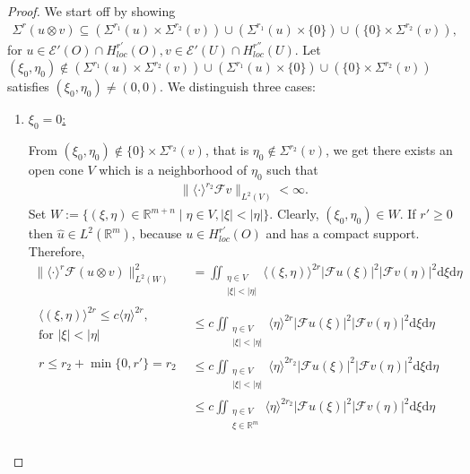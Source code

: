 \documentclass[10pt,a4paper]{amsart}
\begin{document}
\begin{proof}
We start off by showing
\begin{align}
\label{sigma}
\Sigma^r (u\otimes v)
\subseteq
(\Sigma^{r_1} (u) \times \Sigma^{r_2} (v)) \cup (\Sigma^{r_1} (u) \times \{0\}) \cup (\{0\} \times \Sigma^{r_2} (v)),
\end{align}
for $u\in \mathcal{E}' (O) \cap H_{loc} ^{r'} (O) , v\in \mathcal{E}' (U) \cap H_{loc} ^{r''} (U)$. Let $(\xi_0,\eta_0)\notin (\Sigma^{r_1} (u) \times \Sigma^{r_2} (v)) \cup (\Sigma^{r_1} (u) \times \{0\}) \cup (\{0\} \times \Sigma^{r_2} (v))$ satisfies $(\xi_0,\eta_0)\neq (0,0)$. We distinguish three cases:
\begin{enumerate}
\item \underline{$\xi_0 = 0$:}

From $(\xi_0,\eta_0)\notin \{0\} \times \Sigma^{r_2} (v)$, that is $\eta_0 \notin \Sigma^{r_2} (v)$, we get there exists an open cone $V$ which is a neighborhood of $\eta_0$ such that
\begin{align}
\label{eta0}
\lVert \langle\cdot \rangle^{r_2} \mathcal{F} v \rVert_{L^2 (V)}
< \infty.
\end{align}
Set $W:=\{(\xi , \eta) \in \mathbb{R}^{m+n} \mid \eta\in V , |\xi| < |\eta| \}$. Clearly, $(\xi_0,\eta_0)\in W$. If $r'\geq 0$ then $\hat{u}\in L^2 (\mathbb{R}^m)$, because $u\in H_{loc}  ^{r'} (O)$ and has a compact support. Therefore,
\begin{align*}
\lVert \langle \cdot \rangle^{r} \mathcal{F} (u\otimes v)  \rVert_{L^2 (W)} ^2
&= \iint_{\substack{ \eta\in V \\ |\xi|<|\eta| }} \langle (\xi ,\eta) \rangle^{2r} |\mathcal{F}u (\xi)|^2 |\mathcal{F}v (\eta)|^2 \mathrm{d}\xi \mathrm{d}\eta \\
\boxed{\substack{\langle (\xi ,\eta) \rangle^{2r} \leq c \langle \eta \rangle^{2r}, \\ \text{for } |\xi| < |\eta| }}
&\leq c \iint_{\substack{ \eta\in V \\ |\xi|<|\eta| }} \langle \eta \rangle^{2r} |\mathcal{F}u (\xi)|^2 |\mathcal{F}v (\eta)|^2 \mathrm{d}\xi \mathrm{d}\eta\\
\boxed{\substack{ r \leq r_2 + \min \{0,r'\} = r_2 \\ }}
&\leq c \iint_{\substack{ \eta\in V \\ |\xi|<|\eta| }} \langle \eta \rangle^{2r_2} |\mathcal{F}u (\xi)|^2 |\mathcal{F}v (\eta)|^2 \mathrm{d}\xi \mathrm{d}\eta\\
&\leq c \iint_{\substack{ \eta\in V \\ \xi \in \mathbb{R}^m }} \langle \eta \rangle^{2r_2} |\mathcal{F}u (\xi)|^2 |\mathcal{F}v (\eta)|^2 \mathrm{d}\xi \mathrm{d}\eta\\

\end{align*}
\end{enumerate}
\end{proof}
\end{document}
